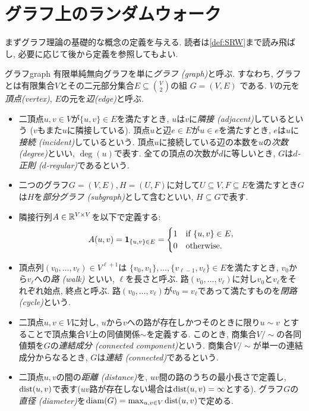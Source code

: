 \section{グラフ上のランダムウォーク}
まずグラフ理論の基礎的な概念の定義を与える.
読者は\cref{def:SRW}まで読み飛ばし, 必要に応じて後から定義を参照してもよい.
%
\begin{definition}{グラフ}{graph}
  有限単純無向グラフを単に\emph{グラフ (graph)}と呼ぶ.
  すなわち, グラフとは有限集合$V$とその二元部分集合$E\subseteq \binom{V}{2}$の組 $G = (V, E)$ である.
  $V$の元を\emph{頂点(vertex)}, $E$の元を\emph{辺(edge)}と呼ぶ.
  \begin{itemize}
    \item 二頂点$u,v\in V$が$\{u,v\}\in E$を満たすとき, $u$は$v$に\emph{隣接 (adjacent)}しているという ($v$もまた$u$に隣接している).
          頂点$u$と辺$e\in E$が$u\in e$を満たすとき, $e$は$u$に\emph{接続 (incident)}しているという.
          頂点$u$に接続している辺の本数を$u$の\emph{次数(degree)}といい, $\deg(u)$で表す.
          全ての頂点の次数が$d$に等しいとき, $G$は\emph{$d$-正則 ($d$-regular)}であるという.
    \item 二つのグラフ$G=(V,E),H=(U,F)$に対して$U\subseteq V,F\subseteq E$を満たすとき$G$は$H$を\emph{部分グラフ (subgraph)}として含むといい, $H\subseteq G$で表す.
    \item 隣接行列$A \in \mathbb{R}^{V\times V}$を以下で定義する:
          \[
            A(u,v) = \mathbf{1}_{\{u,v\}\in E} =
            \begin{cases}
              1 & \text{if }\{u,v\}\in E, \\
              0 & \text{otherwise}.
            \end{cases}
          \]
    \item 頂点列$(v_0,\dots,v_\ell) \in V^{\ell+1}$は
          $\{v_0,v_1\},\dots,\{v_{\ell-1},v_\ell\}\in E$を満たすとき,
          $v_0$から$v_\ell$への\emph{路 (walk)} といい, $\ell$を長さと呼ぶ.
          路$(v_0,\dots,v_\ell)$に対し$v_0$と$v_\ell$をそれぞれ始点, 終点と呼ぶ.
          路$(v_0,\dots,v_\ell)$が$v_0=v_\ell$であって満たすものを\emph{閉路 (cycle)}という.
    \item  二頂点$u,v \in V$に対し,
          $u$から$v$への路が存在しかつそのときに限り$u\sim v$
          とすることで頂点集合$V$上の同値関係$\sim$を定義する.
          このとき, 商集合$V / \sim$の各同値類を$G$の\emph{連結成分 (connected component)}という.
          商集合$V / \sim$が単一の連結成分からなるとき, $G$は\emph{連結 (connected)}であるという.
    \item 二頂点$u,v$の間の\emph{距離 (distance)}を, $uv$間の路のうちの最小長さで定義し, $\mathrm{dist}(u,v)$で表す($uv$路が存在しない場合は$\mathrm{dist}(u,v)=\infty$とする). グラフ$G$の\emph{直径 (diameter)}を$\mathrm{diam}(G)=\max_{u,v\in V}\mathrm{dist}(u,v)$で定める.

\end{itemize}
\end{definition}
